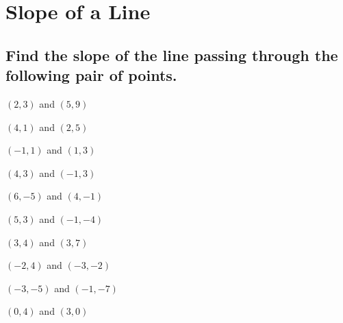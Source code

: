 \section{Slope of a Line}

\subsection*{Find the slope of the line passing through the following pair of points.}

\begin{puzzle}
    \item $(2, 3)$ and $(5, 9)$
\end{puzzle}

\begin{puzzle}
    \item $(4, 1)$ and $(2, 5)$
\end{puzzle}

\begin{puzzle}
    \item $(-1, 1)$ and $(1, 3)$
\end{puzzle}

\begin{puzzle}
    \item $(4, 3)$ and $(-1, 3)$
\end{puzzle}

\begin{puzzle}
    \item $(6, -5)$ and $(4, -1)$
\end{puzzle}

\begin{puzzle}
    \item $(5, 3)$ and $(-1, -4)$
\end{puzzle}

\begin{puzzle}
    \item $(3, 4)$ and $(3, 7)$
\end{puzzle}

\begin{puzzle}
    \item $(-2, 4)$ and $(-3, -2)$
\end{puzzle}

\begin{puzzle}
    \item $(-3, -5)$ and $(-1, -7)$
\end{puzzle}

\begin{puzzle}
    \item $(0, 4)$ and $(3, 0)$
\end{puzzle}

